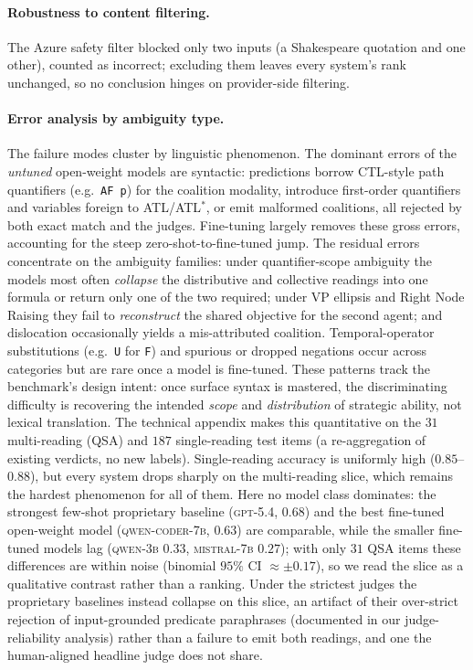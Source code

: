 \paragraph{Robustness to content filtering.}
The Azure safety filter blocked only two inputs (a Shakespeare quotation and one other), counted as incorrect; excluding them leaves every system's rank unchanged, so no conclusion hinges on provider-side filtering.

\paragraph{Error analysis by ambiguity type.}
The failure modes cluster by linguistic phenomenon. The dominant errors of the \emph{untuned} open-weight models are syntactic: predictions borrow CTL-style path quantifiers (e.g.\ \texttt{AF\,p}) for the coalition modality, introduce first-order quantifiers and variables foreign to ATL/ATL$^\ast$, or emit malformed coalitions, all rejected by both exact match and the judges. Fine-tuning largely removes these gross errors, accounting for the steep zero-shot-to-fine-tuned jump. The residual errors concentrate on the ambiguity families: under quantifier-scope ambiguity the models most often \emph{collapse} the distributive and collective readings into one formula or return only one of the two required; under VP ellipsis and Right Node Raising they fail to \emph{reconstruct} the shared objective for the second agent; and dislocation occasionally yields a mis-attributed coalition. Temporal-operator substitutions (e.g.\ \texttt{U} for \texttt{F}) and spurious or dropped negations occur across categories but are rare once a model is fine-tuned. These patterns track the benchmark's design intent: once surface syntax is mastered, the discriminating difficulty is recovering the intended \emph{scope} and \emph{distribution} of strategic ability, not lexical translation. The technical appendix makes this quantitative on the $31$ multi-reading (QSA) and $187$ single-reading test items (a re-aggregation of existing verdicts, no new labels). Single-reading accuracy is uniformly high ($0.85$--$0.88$), but every system drops sharply on the multi-reading slice, which remains the hardest phenomenon for all of them. Here no model class dominates: the strongest few-shot proprietary baseline (\textsc{gpt-5.4}, $0.68$) and the best fine-tuned open-weight model (\textsc{qwen-coder-7b}, $0.63$) are comparable, while the smaller fine-tuned models lag (\textsc{qwen-3b} $0.33$, \textsc{mistral-7b} $0.27$); with only $31$ QSA items these differences are within noise (binomial $95\%$ CI $\approx\pm0.17$), so we read the slice as a qualitative contrast rather than a ranking. Under the strictest judges the proprietary baselines instead collapse on this slice, an artifact of their over-strict rejection of input-grounded predicate paraphrases (documented in our judge-reliability analysis) rather than a failure to emit both readings, and one the human-aligned headline judge does not share.

